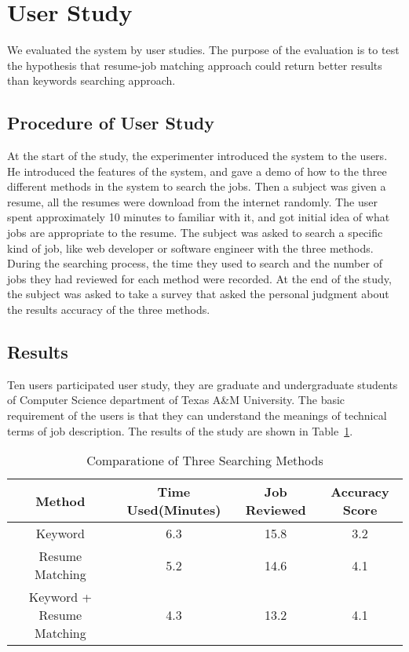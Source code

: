 \section{User Study}

We evaluated the system by user studies. The purpose of the evaluation is to test the hypothesis that resume-job matching approach could return better results than keywords searching approach.

\subsection{Procedure of User Study}

At the start of the study, the experimenter introduced the system to the users. He introduced the features of the system, and gave a demo of how to the three different methods in the system to search the jobs. Then a subject was given a resume, all the resumes were download from the internet randomly. The user spent approximately 10 minutes to familiar with it, and got initial idea of what jobs are appropriate to the resume. The subject was asked to search a specific kind of job, like web developer or software engineer with the three methods. During the searching process, the time they used to search and the number of jobs they had reviewed for each method were recorded.  At the end of the study, the subject was asked to take a survey that asked  the personal judgment about the results accuracy of the three methods.


\subsection{Results}


Ten users participated user study, they are graduate and undergraduate students of Computer Science department of Texas A\&M University. The basic requirement of the users is that they can understand the meanings of technical terms of job description. The results of the study are shown in Table~\ref{tab:methodcompare}.


\begin{table}[ht]
\caption{Comparatione of Three Searching Methods } %
\centering %
\begin{tabular}{  | c | c | c | c | }  
 \hline
 Method                    &  Time Used(Minutes)    & Job Reviewed & Accuracy Score  \\
 \hline
 Keyword                   & 6.3                    & 15.8         &       3.2         \\
 \hline
 Resume Matching           & 5.2                    & 14.6         &       4.1         \\
  \hline 
 Keyword + Resume Matching & 4.3                    & 13.2         &       4.1       \\
  \hline
\end{tabular}
\label{tab:methodcompare} %
\end{table}